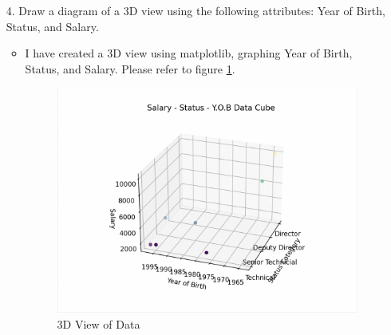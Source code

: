 \documentclass{scrreprt}
\begin{document}
\begin{enumerate}
	\item[4.] Draw a diagram of a 3D view using the following attributes: Year of Birth, Status, and Salary.
\begin{itemize}
	\item I have created a 3D view using matplotlib, graphing Year of Birth, Status, and Salary. Please refer to figure \ref{q3}. 
	
	\begin{figure}[h!]
		\centering
		\includegraphics[width=0.95\linewidth]{3d_plot.png}
		\caption{3D View of Data}\label{q3}
	\end{figure}

\end{itemize}


\end{enumerate}
\end{document}
